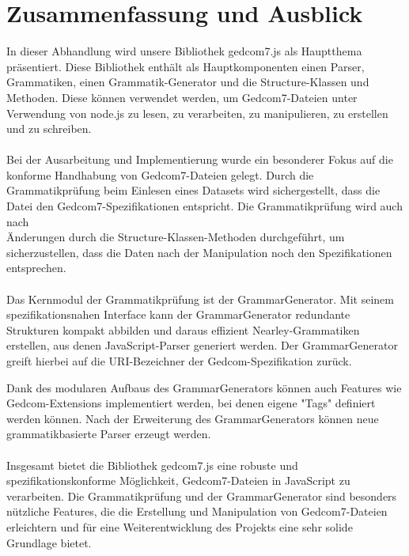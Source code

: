 \chapter{Zusammenfassung und Ausblick}
\label{chap: Zusammenfassung und Ausblick}

In dieser Abhandlung wird unsere Bibliothek gedcom7.js als Hauptthema präsentiert. Diese Bibliothek enthält 
als Hauptkomponenten einen Parser, Grammatiken, einen Grammatik-Generator und die Structure-Klassen und Methoden. 
Diese können verwendet werden, um Gedcom7-Dateien unter Verwendung von node.js zu 
lesen, zu verarbeiten, zu manipulieren, zu erstellen und zu schreiben.
\\\\
Bei der Ausarbeitung und Implementierung wurde ein besonderer Fokus auf die konforme Handhabung von 
Gedcom7-Dateien gelegt. Durch die Grammatikprüfung beim Einlesen eines Datasets wird sichergestellt, 
dass die Datei den Gedcom7-Spezifikationen entspricht. Die Grammatikprüfung wird auch nach\\Änderungen 
durch die Structure-Klassen-Methoden durchgeführt, um sicherzustellen, dass die Daten nach der 
Manipulation noch den Spezifikationen entsprechen.
\\\\
Das Kernmodul der Grammatikprüfung ist der GrammarGenerator. Mit seinem spezifikationsnahen Interface
kann der GrammarGenerator redundante Strukturen kompakt abbilden und daraus effizient Nearley-Grammatiken
erstellen, aus denen JavaScript-Parser generiert werden. Der GrammarGenerator greift hierbei auf die 
URI-Bezeichner der Gedcom-Spezifikation zurück.

Dank des modularen Aufbaus des GrammarGenerators können auch Features wie Gedcom-Extensions implementiert
werden, bei denen eigene "Tags" definiert werden können. Nach der Erweiterung des GrammarGenerators 
können neue grammatikbasierte Parser erzeugt werden.
\\\\  
Insgesamt bietet die Bibliothek gedcom7.js eine robuste und spezifikationskonforme Möglichkeit, 
Gedcom7-Dateien in JavaScript zu verarbeiten. Die Grammatikprüfung und der GrammarGenerator sind 
besonders nützliche Features, die die Erstellung und Manipulation von Gedcom7-Dateien erleichtern
und für eine Weiterentwicklung des Projekts eine sehr solide Grundlage bietet.